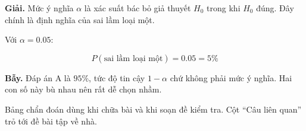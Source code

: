 \documentclass[11pt, a4paper]{article}
\begin{document}
\begin{dapan}[15 — Đáp án B]
\textbf{Giải.} Mức ý nghĩa $\alpha$ là xác suất bác bỏ giả thuyết $H_0$ trong khi $H_0$ đúng. Đây chính là định nghĩa của sai lầm loại một.

Với $\alpha = 0.05$:

$$P(\text{sai lầm loại một}) = 0.05 = 5\%$$

\textbf{Bẫy.} Đáp án A là $95\%$, tức độ tin cậy $1 - \alpha$ chứ không phải mức ý nghĩa. Hai con số này bù nhau nên rất dễ chọn nhầm.
\end{dapan}

\clearpage
{}

Bảng chẩn đoán dùng khi chữa bài và khi soạn đề kiểm tra. Cột ``Câu liên quan'' trỏ tới đề bài tập về nhà.
\end{document}
